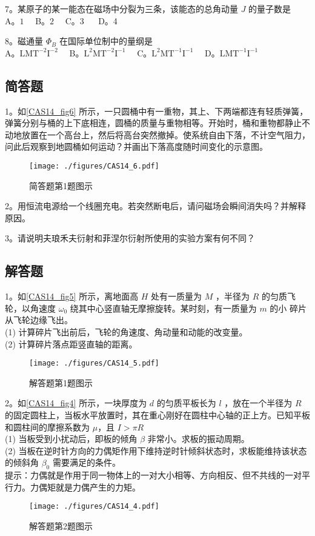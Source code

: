 7。某原子的某一能态在磁场中分裂为三条，该能态的总角动量 $J$ 的量子数是\\
A。$1\quad $ B。$2 \quad$ C。3 $\quad$ D。4

8。磁通量 $\Phi_B$ 在国际单位制中的量纲是\\
A。$\mathrm{LMT^{-2}I^{-2}}\quad$ B。$\mathrm{L^{2}MT^{-2}I^{-1}}\quad$ C。$\mathrm{L^{2}MT^{-1}I^{-1}}\quad$ D。$\mathrm{LMT^{-1}I^{-1}}$

\subsection{简答题}
1。如\autoref{CAS14_fig6} 所示，一只圆桶中有一重物，其上、下两端都连有轻质弹簧，弹簧分别与桶的上下底相连，圆桶的质量与重物相等。开始时，桶和重物都静止不动地放置在一个高台上，然后将高台突然撤掉。使系统自由下落，不计空气阻力，问此后观察到地圆桶如何运动？并画出下落高度随时间变化的示意图。
\begin{figure}[ht]
\centering
\texttt{[image: ./figures/CAS14\_6.pdf]}
\caption{简答题第1题图示} \label{CAS14_fig6}
\end{figure}

2。用恒流电源给一个线圈充电。若突然断电后，请问磁场会瞬间消失吗？并解释原因。


3。请说明夫琅禾夫衍射和菲涅尔衍射所使用的实验方案有何不同？


\subsection{解答题}
1。如\autoref{CAS14_fig5} 所示，离地面高 $H$ 处有一质量为 $M$ ，半径为 $R$ 的匀质飞轮，以角速度 $\omega_0$ 绕其中心竖直轴无摩擦旋转。某时刻，有一质量为 $m$ 的小 碎片从飞轮边缘飞出。\\
(1) 计算碎片飞出前后，飞轮的角速度、角动量和动能的改变量。\\
(2) 计算碎片落点距竖直轴的距离。
\begin{figure}[ht]
\centering
\texttt{[image: ./figures/CAS14\_5.pdf]}
\caption{解答题第1题图示} \label{CAS14_fig5}
\end{figure}

2。如\autoref{CAS14_fig4} 所示，一块厚度为 $d$ 的匀质平板长为 $l$ ，放在一个半径为 $R$ 的固定圆柱上，当板水平放置时，其在重心刚好在圆柱中心轴的正上方。已知平板和圆柱间的摩擦系数为 $\mu$，且 $I>\pi R$\\
(1) 当板受到小扰动后，即板的倾角 $\beta$ 非常小。求板的振动周期。\\
(2) 当板在逆时针方向的力偶矩作用下维持逆时针倾斜状态时，求板能维持该状态的倾斜角 $\beta_0$ 需要满足的条件。\\
提示：力偶就是作用于同一物体上的一对大小相等、方向相反、但不共线的一对平行力。力偶矩就是力偶产生的力矩。
\begin{figure}[ht]
\centering
\texttt{[image: ./figures/CAS14\_4.pdf]}
\caption{解答题第2题图示} \label{CAS14_fig4}
\end{figure}

